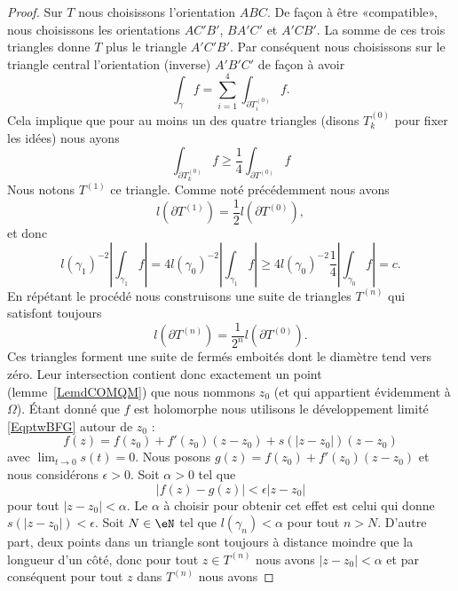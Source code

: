 \begin{proof}
	Sur \( T\) nous choisissons l'orientation \( ABC\). De façon à être «compatible», nous choisissons les orientations \( AC'B'\), \( BA'C'\) et \( A'CB'\). La somme de ces trois triangles donne \( T\) plus le triangle \( A'C'B'\). Par conséquent nous choisissons sur le triangle central l'orientation (inverse) \( A'B'C'\) de façon à avoir
	\begin{equation}
		\int_{\gamma}f=\sum_{i=1}^4\int_{\partial T^{(0)}_i}f.
	\end{equation}
	Cela implique que pour au moins un des quatre triangles (disons \( T^{(0)}_k\) pour fixer les idées) nous ayons
	\begin{equation}
		\int_{\partial T^{(0)}_k}f\geq \frac{1}{ 4 }\int_{\partial T^{(0)}}f
	\end{equation}
	Nous notons \( T^{(1)}\) ce triangle. Comme noté précédemment nous avons
	\begin{equation}
		l(\partial T^{(1)})=\frac{ 1 }{2}l(\partial T^{(0)}),
	\end{equation}
	et donc
	\begin{equation}
		l(\gamma_1)^{-2}| \int_{\gamma_1} f|=4l(\gamma_0)^{-2}| \int_{\gamma_1}f |\geq 4l(\gamma_0)^{-2}\frac{1}{ 4 }| \int_{\gamma_0}f |=c.
	\end{equation}
	En répétant le procédé nous construisons une suite de triangles \( T^{(n)}\) qui satisfont toujours
	\begin{equation}
		l(\partial T^{(n)})=\frac{1}{ 2^n }l(\partial T^{(0)}).
	\end{equation}
	Ces triangles forment une suite de fermés emboités dont le diamètre tend vers zéro. Leur intersection contient donc exactement un point (lemme~\ref{LemdCOMQM}) que nous nommons \( z_0\) (et qui appartient évidemment à \( \Omega\)). Étant donné que \( f\) est holomorphe nous utilisons le développement limité \eqref{EqptwBFG} autour de \( z_0\) :
	\begin{equation}
		f(z)=f(z_0)+f'(z_0)(z-z_0)+s(| z-z_0 |)(z-z_0)
	\end{equation}
	avec \( \lim_{t\to 0} s(t)=0\). Nous posons \( g(z)=f(z_0)+f'(z_0)(z-z_0)\) et nous considérons \( \epsilon>0\). Soit \( \alpha>0\) tel que
	\begin{equation}
		| f(z)-g(z) |<\epsilon| z-z_0 |
	\end{equation}
	pour tout \( | z-z_0 |<\alpha\). Le \( \alpha\) à choisir pour obtenir cet effet est celui qui donne \( s(| z-z_0 |)<\epsilon\). Soit \( N\in \eN\) tel que \( l(\gamma_n)<\alpha\) pour tout \( n>N\). D'autre part, deux points dans un triangle sont toujours à distance moindre que la longueur d'un côté, donc pour tout \( z\in T^{(n)}\) nous avons \( | z-z_0 |<\alpha\) et par conséquent pour tout \( z\) dans \( T^{(n)}\) nous avons

\end{proof}
